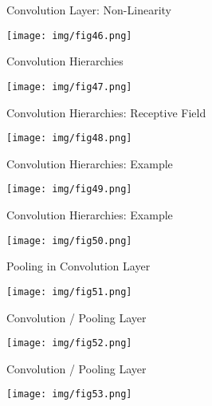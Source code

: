 \documentclass[9pt]{beamer}
\begin{document}
\begin{frame}{Convolution Layer: Non-Linearity}
\begin{center}
	\texttt{[image: img/fig46.png]} 
\end{center}
\end{frame}

\begin{frame}{Convolution Hierarchies}
\begin{center}
	\texttt{[image: img/fig47.png]} 
\end{center}
\end{frame}

\begin{frame}{Convolution Hierarchies: Receptive Field}
\begin{center}
	\texttt{[image: img/fig48.png]} 
\end{center}
\end{frame}

\begin{frame}{Convolution Hierarchies: Example}
\begin{center}
	\texttt{[image: img/fig49.png]} 
\end{center}
\end{frame}

\begin{frame}{Convolution Hierarchies: Example}
\begin{center}
	\texttt{[image: img/fig50.png]} 
\end{center}
\end{frame}

\begin{frame}{Pooling in Convolution Layer}
\begin{center}
	\texttt{[image: img/fig51.png]} 
\end{center}
\end{frame}

\begin{frame}{Convolution / Pooling Layer}
\begin{center}
	\texttt{[image: img/fig52.png]} 
\end{center}
\end{frame}

\begin{frame}{Convolution / Pooling Layer}
\begin{center}
	\texttt{[image: img/fig53.png]} 
\end{center}
\end{frame}
\end{document}
